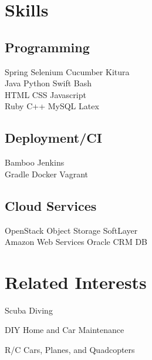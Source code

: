 \documentclass[letterpaper]{resume} %
\begin{document}
\begin{minipage}[t]{0.33\textwidth}
\sectionspace %


\section{Skills}

\subsection{Programming}

Spring \textbullet{} Selenium \textbullet{} Cucumber \textbullet{} Kitura \\
\sectionspace
{}
Java \textbullet{} Python \textbullet{} Swift \textbullet{} Bash \\
HTML \textbullet{} CSS  \textbullet{} Javascript \\
\sectionspace
{}
Ruby \textbullet{} C++ \textbullet{} MySQL \textbullet{} Latex

\sectionspace

\subsection{Deployment/CI}
Bamboo \textbullet{} Jenkins \\
Gradle \textbullet{} Docker \textbullet{} Vagrant\\ 

\sectionspace %

\subsection{Cloud Services}
OpenStack Object Storage
\textbullet{} SoftLayer \\
Amazon Web Services
\textbullet{} Oracle CRM DB



\section{Related Interests}
\sectionspace %
\begin{tightitemize}
\item Scuba Diving
\item DIY Home and Car Maintenance
\item R/C Cars, Planes, and Quadcopters
\end{tightitemize}


\end{minipage} %
\end{document}
